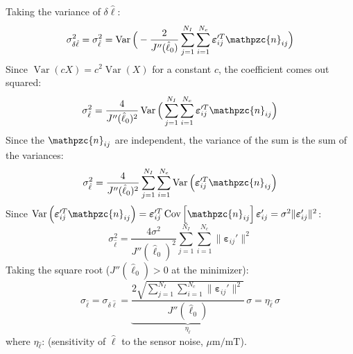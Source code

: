 \documentclass[11pt]{article}
\newcommand{\lh}{\hat{\ell}}
\newcommand{\dl}{\delta\hat{\ell}}
\newcommand{\nn}{\mathpzc{n}}   %
\begin{document}
Taking the variance of $\dl$:
\[
\sigma_{\dl}^{2}=\sigma_{\lh}^{2}=\operatorname{Var}\Big(-\frac{2}{J''(\lh_0)}\sum_{j=1}^{N_I}\sum_{i=1}^{N_c}\boldsymbol{\varepsilon}_{ij}'^{T}\nn_{ij}\Big)
\]
Since $\operatorname{Var}(cX)=c^{2}\operatorname{Var}(X)$ for a constant $c$, the coefficient comes out squared:
\[
\sigma_{\lh}^{2}=\frac{4}{J''(\lh_0)^{2}}\operatorname{Var}\Big(\sum_{j=1}^{N_I}\sum_{i=1}^{N_c}\boldsymbol{\varepsilon}_{ij}'^{T}\nn_{ij}\Big)
\]
Since the $\nn_{ij}$ are independent, the variance of the sum is the sum of the variances:
\[
\sigma_{\lh}^{2}=\frac{4}{J''(\lh_0)^{2}}\sum_{j=1}^{N_I}\sum_{i=1}^{N_c}\operatorname{Var}\left(\boldsymbol{\varepsilon}_{ij}'^{T}\nn_{ij}\right)
\]
Since $\operatorname{Var}\left(\boldsymbol{\varepsilon}_{ij}'^{T}\nn_{ij}\right)=\boldsymbol{\varepsilon}_{ij}'^{T}\operatorname{Cov}\left[\nn_{ij}\right]\boldsymbol{\varepsilon}_{ij}'=\sigma^{2}\|\boldsymbol{\varepsilon}_{ij}'\|^{2}$:
\[
\sigma_{\lh}^{2}=\frac{4\sigma^{2}}{J''(\lh_0)^{2}}\sum_{j=1}^{N_I}\sum_{i=1}^{N_c}\|\boldsymbol{\varepsilon}_{ij}'\|^{2}
\]
Taking the square root ($J''(\lh_0)>0$ at the minimizer):
\[
\sigma_{\lh}=\sigma_{\dl}=\underbrace{\frac{2\sqrt{\sum_{j=1}^{N_I}\sum_{i=1}^{N_c}\|\boldsymbol{\varepsilon}_{ij}'\|^{2}}}{J''(\lh_0)}}_{\eta_{\lh}}\,\sigma
=\eta_{\lh}\,\sigma
\]
where $\eta_{\lh}$: (sensitivity of $\lh$ to the sensor noise, $\mu\mathrm{m}/\mathrm{mT}$).
\end{document}
